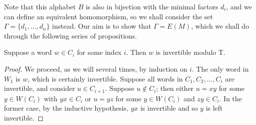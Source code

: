 \documentclass[libertine,widepage]{lmaths}
\begin{document}
Note that this alphabet $B$ is also in bijection with the minimal factors $d_i$, and we can define an equivalent homomorphism, so we shall consider the set $\Gamma = \{d_1, \ldots, d_n\}$ instead. Our aim is to show that $\Gamma = E(M)$, which we shall do through the following series of propositions.

\begin{lemma}
	Suppose a word $w \in C_i$ for some index $i$. Then $w$ is invertible modulo T.
\end{lemma}
\begin{proof}
	We proceed, as we will several times, by induction on $i$. The only word in $W_1$ is $w$, which is certainly invertible. Suppose all words in $C_1, C_2, \ldots, C_i$ are invertible, and consider $u \in C_{i+1}$. Suppose $u \not\in C_i$; then either $u = xy$ for some $y \in W(C_i)$ with $yx \in C_i$ or $u = yz$ for some $y \in W(C_i)$ and $zy \in C_i$. In the former case, by the inductive hypothesis, $yx$ is invertible and so $y$ is left invertible.
\end{proof}
\end{document}
